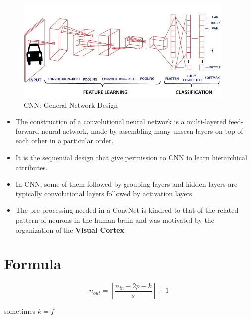\begin{figure}[h]
    \centering
    \includegraphics[width=\linewidth, height=5cm, keepaspectratio]{Pictures/convolutional-neural-network/convolutional-neural-network.jpg}
    \caption{CNN: General Network Design}
\end{figure}

\begin{itemize}
    \item The construction of a convolutional neural network is a multi-layered feed-forward neural network, made by assembling many unseen layers on top of each other in a particular order.

    \item It is the sequential design that give permission to CNN to learn hierarchical attributes.
    
    \item In CNN, some of them followed by grouping layers and hidden layers are typically convolutional layers followed by activation layers.
    
    \item The pre-processing needed in a ConvNet is kindred to that of the related pattern of neurons in the human brain and was motivated by the organization of the \textbf{Visual Cortex}.
\end{itemize}


\section{Formula}
\[
   \displaystyle n_{out} = \left[ \frac{n_{in} + 2p - k}{s} \right] + 1
\]

sometimes $k=f$


